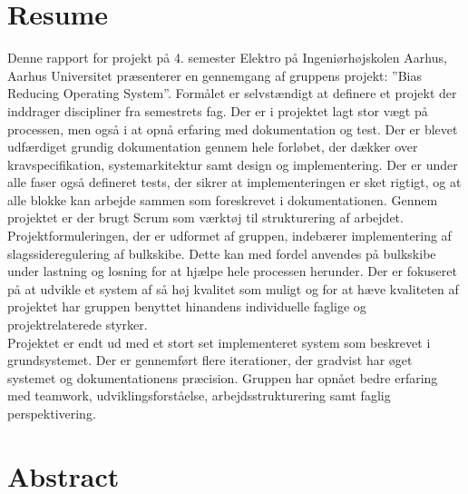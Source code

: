 \chapter{Resume}
Denne rapport for projekt på 4. semester Elektro på Ingeniørhøjskolen Aarhus, Aarhus Universitet præsenterer en gennemgang af gruppens projekt: ”Bias Reducing Operating System”. Formålet er selvstændigt at definere et projekt der inddrager discipliner fra semestrets fag. 
Der er i projektet lagt stor vægt på processen, men også i at opnå erfaring med dokumentation og test. Der er blevet udfærdiget grundig dokumentation gennem hele forløbet, der dækker over kravspecifikation, systemarkitektur samt design og implementering. Der er under alle faser også defineret tests, der sikrer at implementeringen er sket rigtigt, og at alle blokke kan arbejde sammen som foreskrevet i dokumentationen. Gennem projektet er der brugt Scrum som værktøj til strukturering af arbejdet.\\

Projektformuleringen, der er udformet af gruppen, indebærer implementering af slagssideregulering af bulkskibe. Dette kan med fordel anvendes på bulkskibe under lastning og losning for at hjælpe hele processen herunder. Der er fokuseret på at udvikle et system af så høj kvalitet som muligt og for at hæve kvaliteten af projektet har gruppen benyttet hinandens individuelle faglige og projektrelaterede styrker.\\

Projektet er endt ud med et stort set implementeret system som beskrevet i grundsystemet. Der er gennemført flere iterationer, der gradvist har øget systemet og dokumentationens præcision. Gruppen har opnået bedre erfaring med teamwork, udviklingsforståelse, arbejdsstrukturering samt faglig perspektivering.

\chapter{Abstract}

\newpage